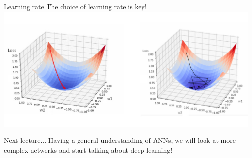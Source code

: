 \documentclass[9pt, aspectratio=169]{beamer}
\begin{document}
\begin{frame}
    {Learning rate}
    The choice of learning rate is key!
    \centering
    \includegraphics[width=\textwidth]{learningrate.jpg}
\end{frame}

\begin{frame}
{Next lecture...}
Having a general understanding of ANNs, we will look at more complex networks and start talking about deep learning!
\end{frame}
\end{document}
